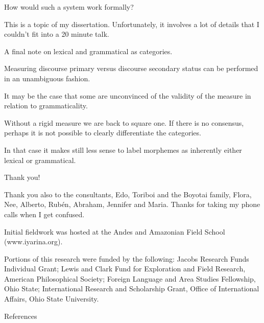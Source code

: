 \documentclass{beamer}
\begin{document}
\begin{frame}{How would such a system work formally?}
  
  This is a topic of my dissertation.
  Unfortunately, it involves a lot of details that I couldn't fit into a 20 minute talk.
  
\end{frame}

\begin{frame}{A final note on lexical and grammatical as categories.}

  Measuring discourse primary versus discourse secondary status can be performed in an unambiguous fashion.

  It may be the case that some are unconvinced of the validity of the measure in relation to grammaticality.
\end{frame}

\begin{frame}{Without a rigid measure we are back to square one.}
  If there is no consensus, perhaps it is not possible to clearly differentiate the categories.

  \vfill

  In that case it makes still less sense to label morphemes as inherently either lexical or grammatical.
\end{frame}

\begin{frame}{Thank you!}

  Thank you also to the consultants, Edo, Toriboi and the Boyotai family, Flora, Nee, Alberto, Rubén, Abraham, Jennifer and Maria.
  Thanks for taking my phone calls when I get confused.

  \vfill

  Initial fieldwork was hosted at the Andes and Amazonian Field School (www.iyarina.org).
  
  \vfill

  \footnotesize
  Portions of this research were funded by the following: Jacobs Research Funds Individual Grant; Lewis and Clark Fund for Exploration and Field Research, American Philosophical Society; Foreign Language and Area Studies Fellowship, Ohio State; International Research and Scholarship Grant, Office of International Affairs, Ohio State University.
  
\end{frame}

\begin{frame}[allowframebreaks]{References}
  \printbibliography
\end{frame}
\end{document}
